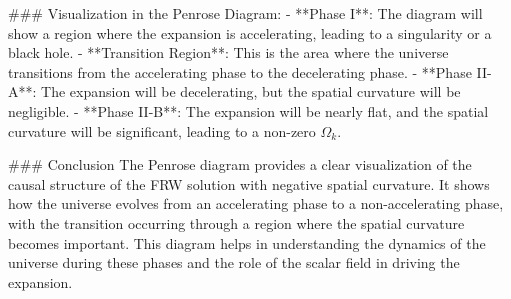 ### Visualization in the Penrose Diagram:
- **Phase I**: The diagram will show a region where the expansion is accelerating, leading to a singularity or a black hole.
- **Transition Region**: This is the area where the universe transitions from the accelerating phase to the decelerating phase.
- **Phase II-A**: The expansion will be decelerating, but the spatial curvature will be negligible.
- **Phase II-B**: The expansion will be nearly flat, and the spatial curvature will be significant, leading to a non-zero \(\Omega_k\).

### Conclusion
The Penrose diagram provides a clear visualization of the causal structure of the FRW solution with negative spatial curvature. It shows how the universe evolves from an accelerating phase to a non-accelerating phase, with the transition occurring through a region where the spatial curvature becomes important. This diagram helps in understanding the dynamics of the universe during these phases and the role of the scalar field in driving the expansion.